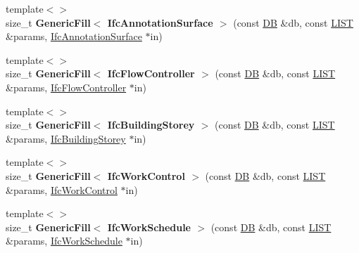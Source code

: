 \begin{DoxyCompactItemize}
\item 
\hypertarget{namespace_assimp_1_1_s_t_e_p_a385c5f409b4cf648e0d80b134e7a5be4}{{\footnotesize template$<$$>$ }\\size\+\_\+t {\bfseries Generic\+Fill$<$ Ifc\+Annotation\+Surface $>$} (const \hyperlink{class_assimp_1_1_s_t_e_p_1_1_d_b}{D\+B} \&db, const \hyperlink{class_assimp_1_1_s_t_e_p_1_1_e_x_p_r_e_s_s_1_1_l_i_s_t}{L\+I\+S\+T} \&params, \hyperlink{struct_assimp_1_1_i_f_c_1_1_ifc_annotation_surface}{Ifc\+Annotation\+Surface} $\ast$in)}\label{namespace_assimp_1_1_s_t_e_p_a385c5f409b4cf648e0d80b134e7a5be4}

\item 
\hypertarget{namespace_assimp_1_1_s_t_e_p_aaf34380db2b1b1b9f2aacdb106044690}{{\footnotesize template$<$$>$ }\\size\+\_\+t {\bfseries Generic\+Fill$<$ Ifc\+Flow\+Controller $>$} (const \hyperlink{class_assimp_1_1_s_t_e_p_1_1_d_b}{D\+B} \&db, const \hyperlink{class_assimp_1_1_s_t_e_p_1_1_e_x_p_r_e_s_s_1_1_l_i_s_t}{L\+I\+S\+T} \&params, \hyperlink{struct_assimp_1_1_i_f_c_1_1_ifc_flow_controller}{Ifc\+Flow\+Controller} $\ast$in)}\label{namespace_assimp_1_1_s_t_e_p_aaf34380db2b1b1b9f2aacdb106044690}

\item 
\hypertarget{namespace_assimp_1_1_s_t_e_p_ac3b70213033b5aa483f20a43bce3d539}{{\footnotesize template$<$$>$ }\\size\+\_\+t {\bfseries Generic\+Fill$<$ Ifc\+Building\+Storey $>$} (const \hyperlink{class_assimp_1_1_s_t_e_p_1_1_d_b}{D\+B} \&db, const \hyperlink{class_assimp_1_1_s_t_e_p_1_1_e_x_p_r_e_s_s_1_1_l_i_s_t}{L\+I\+S\+T} \&params, \hyperlink{struct_assimp_1_1_i_f_c_1_1_ifc_building_storey}{Ifc\+Building\+Storey} $\ast$in)}\label{namespace_assimp_1_1_s_t_e_p_ac3b70213033b5aa483f20a43bce3d539}

\item 
\hypertarget{namespace_assimp_1_1_s_t_e_p_a6114b7e4c6ccfd5a62382d9b836460fd}{{\footnotesize template$<$$>$ }\\size\+\_\+t {\bfseries Generic\+Fill$<$ Ifc\+Work\+Control $>$} (const \hyperlink{class_assimp_1_1_s_t_e_p_1_1_d_b}{D\+B} \&db, const \hyperlink{class_assimp_1_1_s_t_e_p_1_1_e_x_p_r_e_s_s_1_1_l_i_s_t}{L\+I\+S\+T} \&params, \hyperlink{struct_assimp_1_1_i_f_c_1_1_ifc_work_control}{Ifc\+Work\+Control} $\ast$in)}\label{namespace_assimp_1_1_s_t_e_p_a6114b7e4c6ccfd5a62382d9b836460fd}

\item 
\hypertarget{namespace_assimp_1_1_s_t_e_p_a08c2fd4c83a16ac1b008d8777d3b193b}{{\footnotesize template$<$$>$ }\\size\+\_\+t {\bfseries Generic\+Fill$<$ Ifc\+Work\+Schedule $>$} (const \hyperlink{class_assimp_1_1_s_t_e_p_1_1_d_b}{D\+B} \&db, const \hyperlink{class_assimp_1_1_s_t_e_p_1_1_e_x_p_r_e_s_s_1_1_l_i_s_t}{L\+I\+S\+T} \&params, \hyperlink{struct_assimp_1_1_i_f_c_1_1_ifc_work_schedule}{Ifc\+Work\+Schedule} $\ast$in)}\label{namespace_assimp_1_1_s_t_e_p_a08c2fd4c83a16ac1b008d8777d3b193b}


\end{DoxyCompactItemize}
